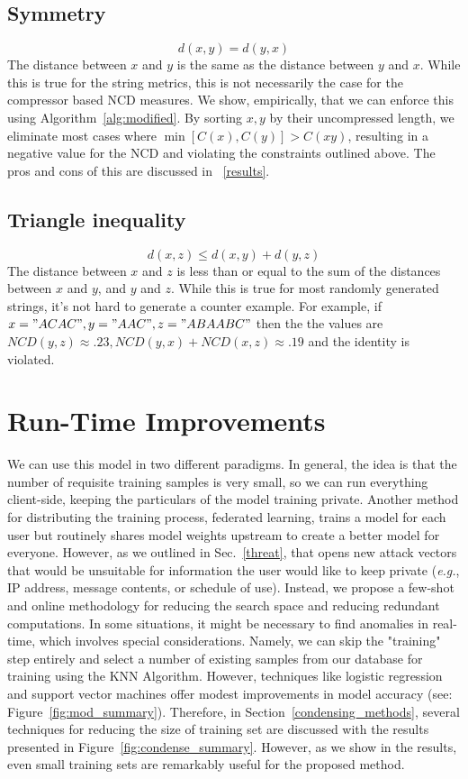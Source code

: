 \documentclass[conference]{IEEEtran}
\begin{document}
\subsection{Symmetry} 
\[
d(x, y) = d(y, x)
\]
The distance between \( x \) and \( y \) is the same as the distance between \( y \) and \( x \). While this is true for the string metrics, this is not necessarily the case for the compressor based NCD measures. 
We show, empirically, that we can enforce this using Algorithm~\ref{alg:modified}. 
By sorting $x,y$ by their uncompressed length, we eliminate most cases where $\min[C(x), C(y)] > C(xy)$, resulting in a negative value for the NCD and violating the constraints outlined above.
The pros and cons of this are discussed in ~\ref{results}.

\subsection{Triangle inequality} 
\[
d(x, z) \leq d(x, y) + d(y, z)
\]
The distance between \( x \) and \( z \) is less than or equal to the sum of the distances between \( x \) and \( y \), and \( y \) and \( z \). While this is true for most randomly generated strings, it's not hard to generate a counter example. For example, if $ x = "ACAC", y = "AAC", z = "ABAABC" $ then the the values are $ NCD(y,z) \approx .23, NCD(y,x) + NCD(x,z) \approx .19 $ and the identity is violated.





\section{Run-Time Improvements}
\label{improvements}
We can use this model in two different paradigms. In general, the idea is that the number of requisite training samples is very small, so we can run everything client-side, keeping the particulars of the model training private. Another method for distributing the training process, federated learning, trains a model for each user but routinely shares model weights upstream to create a better model for everyone. 
However, as we outlined in Sec.~\ref{threat}, that opens new attack vectors that would be unsuitable for information the user would like to keep private (\textit{e.g.}, IP address, message contents, or schedule of use). 
Instead, we propose a few-shot and online methodology for reducing the search space and reducing redundant computations.
In some situations, it might be necessary to find anomalies in real-time, which involves special considerations. 
Namely, we can skip the "training" step entirely and select a number of existing samples from our database for training using the KNN Algorithm.
However, techniques like logistic regression and support vector machines offer modest improvements in model accuracy (see: Figure~\ref{fig:mod_summary}).
Therefore, in Section~\ref{condensing_methods}, several techniques for reducing the size of training set are discussed with the results presented in Figure~\ref{fig:condense_summary}.
However, as we show in the results, even small training sets are remarkably useful for the proposed method. 
\end{document}
